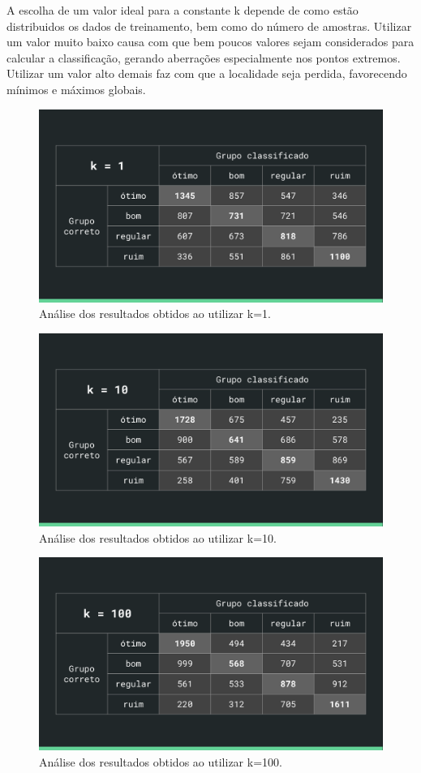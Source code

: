 \documentclass[12pt]{article}
\begin{document}
A escolha de um valor ideal para a constante k depende de como estão distribuidos os dados de treinamento, bem como do
número de amostras. Utilizar um valor muito baixo causa com que bem poucos valores sejam considerados para calcular a
classificação, gerando aberrações especialmente nos pontos extremos. Utilizar um valor alto demais faz com que a
localidade seja perdida, favorecendo mínimos e máximos globais.

\begin{figure}[H]
\centering\includegraphics[width=.55\linewidth]{tab1.png}
\caption{Análise dos resultados obtidos ao utilizar k=1.}
\label{fig:tab1}
\end{figure}

\begin{figure}[H]
\centering\includegraphics[width=.55\linewidth]{tab10.png}
\caption{Análise dos resultados obtidos ao utilizar k=10.}
\label{fig:tab10}
\end{figure}

\begin{figure}[H]
\centering\includegraphics[width=.55\linewidth]{tab100.png}
\caption{Análise dos resultados obtidos ao utilizar k=100.}
\label{fig:tab100}
\end{figure}
\end{document}
